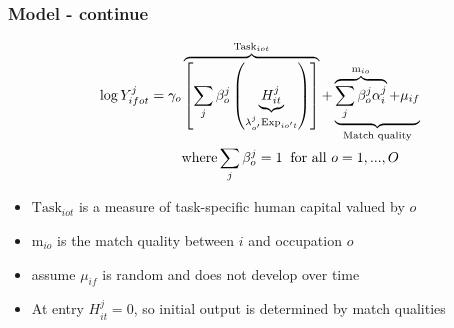 \documentclass[11pt]{beamer}
\begin{document}
\begin{frame}
	\frametitle{Model - continue}
\begin{align}
	\label{eq:eq9}
	\log{Y_{ifot}^j} = \gamma_o&\overbrace{\left[  \sum_j \beta_{o}^j \left( \underbrace{H_{it}^{j}}_{\lambda_{o'}^j \text{Exp}_{io't}}\right)  \right]}^{\text{Task}_{iot}} + \underbrace{\overbrace{\sum_j \beta_{o}^j \alpha_{i}^j }^{\text{m}_{io}}+\mu_{if}}_{\text{Match quality}}\\
	&\text{where} \sum_{j} \beta_{o}^j = 1 \;\;\text{for all }o=1,...,O \notag
\end{align}

	
	\begin{itemize}
		\item $\text{Task}_{iot}$ is a measure of task-specific human capital valued by $o$
		\item $\text{m}_{io}$ is the match quality between $i$ and occupation $o$
		\item assume $\mu_{if}$ is random and does not develop over time
		\item At entry $H_{it}^j=0$, so  initial output is determined by match qualities
	\end{itemize}
	
\end{frame}
\end{document}
